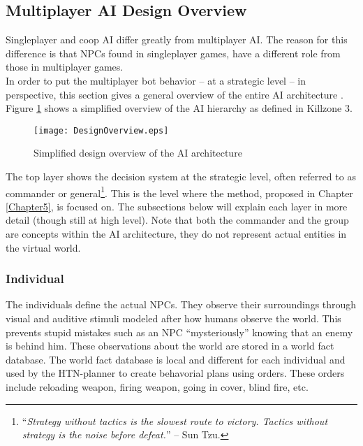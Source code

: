 
\subsection{Multiplayer AI Design Overview}
Singleplayer and coop AI differ greatly from multiplayer AI. The reason for
this difference is that NPCs found in singleplayer games, have a different role
from those in multiplayer games.\\
In order to put the multiplayer bot behavior -- at a strategic level -- in
perspective, this section gives a general overview of the entire AI
architecture \cite{killzone2,killzone2-presentation}.  Figure
\ref{fig:designoverview} shows a simplified overview of the AI hierarchy as
defined in Killzone 3.
\begin{figure}[!ht]
\centering
\texttt{[image: DesignOverview.eps]}
\caption{Simplified design overview of the AI architecture}
\label{fig:designoverview}
\end{figure}
The top layer shows the decision system at the strategic level, often referred
to as commander or general\footnote{``\emph{Strategy without tactics is the
slowest route to victory. Tactics without strategy is the noise before
defeat.}'' -- Sun Tzu.}. This is the level where the method, proposed in
Chapter \ref{Chapter5}, is focused on.  The subsections below will explain
each layer in more detail (though still at high level). Note that both the
commander and the group are concepts within the AI architecture, they do not
represent actual entities in the virtual world.
\subsubsection{Individual}
The individuals define the actual NPCs. They observe their surroundings through
visual and auditive stimuli modeled after how humans observe the world. This
prevents stupid mistakes such as an NPC ``mysteriously'' knowing that an enemy
is behind him. These observations about the world are stored in a world fact
database. The world fact database is local and different for each individual
and used by the HTN-planner to create behavorial plans using orders.  These
orders include reloading weapon, firing weapon, going in cover, blind fire,
etc.
